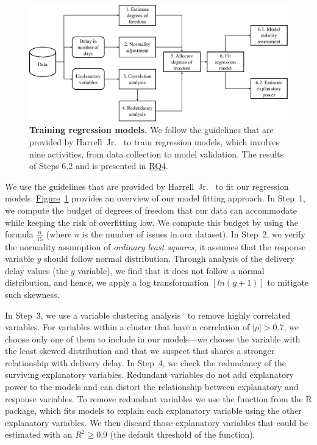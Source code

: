 \begin{figure}
	\centering
	\includegraphics[width=\textwidth,keepaspectratio]
	{chapters/chapter4/figures/linear_model_building_overview}
	\caption{\textbf{Training regression models.} We follow the guidelines
		that are
		provided by Harrell~Jr.~\cite{harrell2001regression} to train regression models, which
	involves nine activities, from data collection to model validation. The
results of Steps 6.2 and is presented in \hyperref[ch4:rq4]{RQ4}.}
	\label{ch4:fig:regression_process}
\end{figure}

We use the guidelines that are provided by
Harrell~Jr.~\cite{harrell2001regression} to fit our regression models.
\hyperref[ch4:fig:regression_process]{Figure}~\ref{ch4:fig:regression_process} provides
an overview of our model fitting approach. In Step~1, we compute the budget of
degrees of freedom that our data can accommodate while keeping the risk of
overfitting low. We compute this budget by using the formula $\frac{n}{15}$
(where $n$ is the number of issues in our dataset). In Step~2, we verify the
normality assumption of \textit{ordinary least squares}, \ie it assumes that the
response variable $y$ should follow normal distribution. Through analysis of the
delivery delay values (\ie the $y$ variable), we find that it does not follow
a normal distribution, and hence, we apply a log transformation $[ln(y+1)]$ to
mitigate such skewness.

In Step~3, we use a variable clustering analysis~\cite{sarle1990varclus} to
remove highly correlated variables. For variables within a cluster that have a
correlation of $|\rho|>0.7$, we choose only one of them to include in our
models---we choose the variable with the least skewed distribution and that we
suspect that shares a stronger relationship with delivery delay. In Step~4, we
check the redundancy of the surviving explanatory variables. Redundant variables
do not add explanatory power to the models and can distort the relationship
between explanatory and response variables. To remove redundant variables we use
the  function from the  R package, which fits models to
explain each explanatory variable using the other explanatory variables. We then
discard those explanatory variables that could be estimated with an $R^2 \geq
0.9$ (the default threshold of the  function).

